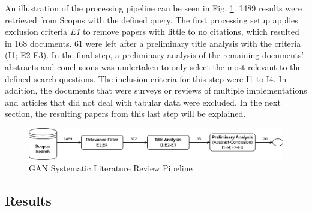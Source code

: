 An illustration of the processing pipeline can be seen in Fig. \ref{fig:slr_pipeline}. 1489 results were retrieved from Scopus with the defined query. The first processing setup applies exclusion criteria \textit{E1} to remove papers with little to no citations, which resulted in 168 documents. 61 were left after a preliminary title analysis with the criteria (I1; E2-E3). In the final step, a preliminary analysis of the remaining documents' abstracts and conclusions was undertaken to only select the most relevant to the defined search questions. The inclusion criteria for this step were I1 to I4. In addition, the documents that were surveys or reviews of multiple implementations and articles that did not deal with tabular data were excluded. In the next section, the resulting papers from this last step will be explained.

\begin{figure}[ht!]
\centering
\includegraphics[width=\textwidth]{figures/slr_pipeline.png}
\caption{GAN Systematic Literature Review Pipeline}
\label{fig:slr_pipeline}
\end{figure}




\subsection{Results}\label{sec:gan_sota_results}

